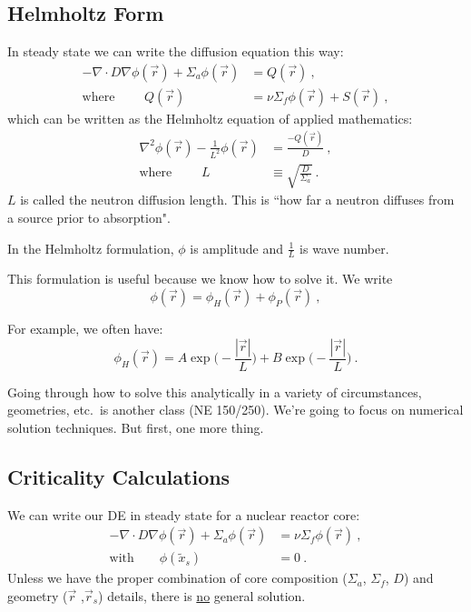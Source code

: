 \documentclass[12pt]{article}
\begin{document}
\subsection*{Helmholtz Form}
In steady state we can write the diffusion equation this way:
%
\begin{align*}
-\nabla \cdot D\nabla \phi(\vec{r}) + 
\Sigma_a \phi(\vec{r}) &= Q(\vec{r})\:, \\
%
\text{where }\qquad Q(\vec{r}) &=
\nu \Sigma_f \phi(\vec{r}) +
S(\vec{r})\:,
\end{align*}
%
which can be written as the Helmholtz equation of applied mathematics:
%
\begin{align*}
\nabla^2 \phi(\vec{r}) - \frac{1}{L^2}\phi(\vec{r}) &= \frac{-Q(\vec{r})}{D}\:, \\
\text{where }\qquad L &\equiv \sqrt{\frac{D}{\Sigma_a}}\:.
\end{align*}
%
$L$ is called the neutron diffusion length. This is ``how far a neutron diffuses from a source prior to absorption". 

In the Helmholtz formulation, $\phi$ is amplitude and $\frac{1}{L}$ is wave number. 

This formulation is useful because we know how to solve it. We write
\[\phi(\vec{r}) = \phi_H(\vec{r}) + \phi_P(\vec{r}) \:,\]

For example, we often have:
\[\phi_H(\vec{r}) = A\exp\bigl(-\frac{|\vec{r}|}{L}\bigr) + B\exp\bigl(-\frac{|\vec{r}|}{L}\bigr) \:.\]

Going through how to solve this analytically in a variety of circumstances, geometries, etc.\ is another class (NE 150/250). We're going to focus on numerical solution techniques. But first, one more thing.

\subsection*{Criticality Calculations}

We can write our DE in steady state for a nuclear reactor core:
%
\begin{align*}
-\nabla \cdot D\nabla \phi(\vec{r}) + 
\Sigma_a \phi(\vec{r}) &= \nu \Sigma_f \phi(\vec{r})\:, \\
\text{with} \qquad \phi(\tilde{x}_s) &= 0\:.
\end{align*}
%
Unless we have the proper combination of core composition ($\Sigma_a$, $\Sigma_f$, $D$) and geometry ($\vec{r}$ ,$\vec{r}_s$) details, there is \underline{no} general solution. 
\end{document}

